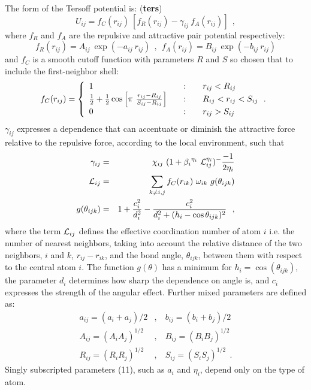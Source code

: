 The form of the Tersoff potential is:  ({\bf ters})
\begin{equation}
U_{ij} = f_{C}(r_{ij})~[f_{R}(r_{ij}) - \gamma_{ij}~f_{A}(r_{ij})]~~,
\end{equation}
where $f_{R}$ and $f_{A}$ are the repulsive and attractive pair
potential respectively:
\begin{equation}
f_{R}(r_{ij}) = A_{ij}~\exp(- a_{ij}~r_{ij})~~,~~
f_{A}(r_{ij}) = B_{ij}~\exp(- b_{ij}~r_{ij})
\end{equation}
and $f_{C}$ is a smooth cutoff function with parameters $R$ and $S$
so chosen that to include the first-neighbor shell:
\begin{equation}
f_{C}(r_{ij}) = \left\{ \begin{array} {l@{\qquad:\qquad}l}
1 & r_{ij} < R_{ij} \\
\frac{1}{2} + \frac{1}{2} \cos \left[\pi~\frac{r_{ij}-R_{ij}}{S_{ij}-R_{ij}}\right]
& R_{ij} < r_{ij} < S_{ij}~~. \\
0 & r_{ij} > S_{ij}
\end{array} \right.
\end{equation}
$\gamma_{ij}$ expresses a dependence that can accentuate or diminish
the attractive force relative to the repulsive force, according to
the local environment, such that
\begin{eqnarray}
\gamma_{ij} &=& \chi_{ij}~(1 + {\beta_{i}}^{\eta_{i}}~{\cal{L}}_{ij}^{\eta_{i}})^-\frac{-1}{2\eta_{i}} \nonumber \\
{\cal{L}}_{ij} &=& \sum_{k \neq i,j} f_{C}(r_{ik})~\omega_{ik}~g(\theta_{ijk}) \\
g(\theta_{ijk}) &=& 1 + \frac{c_{i}^{2}}{d_{i}^{2}} - \frac{c_{i}^{2}}{d_{i}^{2} + (h_{i} - \cos\theta_{ijk})^{2}}~~, \nonumber
\end{eqnarray}
where the term ${\cal{L}}_{ij}$ defines the effective coordination
number of atom $i$ i.e. the number of nearest neighbors, taking into
account the relative distance of the two neighbors, $i$ and $k$,
$r_{ij}-r_{ik}$, and the bond angle, $\theta_{ijk}$, between them
with respect to the central atom $i$.  The function $g(\theta)$ has
a minimum for $h_{i}=\cos(\theta_{ijk})$, the parameter $d_{i}$
determines how sharp the dependence on angle is, and $c_{i}$
expresses the strength of the angular effect.  Further mixed
parameters are defined as:
\begin{eqnarray}
a_{ij} = (a_{i} + a_{j})/2&,&~b_{ij} = (b_{i} + b_{j})/2 \nonumber \\
A_{ij} = (A_{i} A_{j})^{1/2}&,&~B_{ij} = (B_{i} B_{j})^{1/2} \\
R_{ij} = (R_{i} R_{j})^{1/2}&,&~S_{ij} = (S_{i} S_{j})^{1/2}~~.
\nonumber
\end{eqnarray}
Singly subscripted parameters (11), such as $a_{i}$ and $\eta_{i}$,
depend only on the type of atom.

